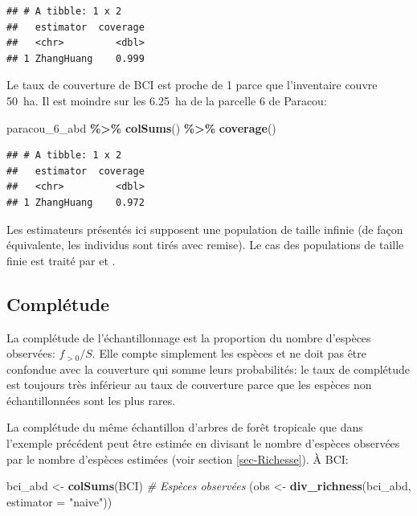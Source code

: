 \documentclass[
  11pt,
  american,
  a4paper,
  extrafontsizes,onecolumn,openright
  ]{memoir}
\newenvironment{Shaded}{\begin{snugshade}}{\end{snugshade}}
\newcommand{\AttributeTok}[1]{\textcolor[rgb]{0.13,0.29,0.53}{#1}}
\newcommand{\CommentTok}[1]{\textcolor[rgb]{0.56,0.35,0.01}{\textit{#1}}}
\newcommand{\FunctionTok}[1]{\textcolor[rgb]{0.13,0.29,0.53}{\textbf{#1}}}
\newcommand{\NormalTok}[1]{#1}
\newcommand{\OtherTok}[1]{\textcolor[rgb]{0.56,0.35,0.01}{#1}}
\newcommand{\SpecialCharTok}[1]{\textcolor[rgb]{0.81,0.36,0.00}{\textbf{#1}}}
\newcommand{\StringTok}[1]{\textcolor[rgb]{0.31,0.60,0.02}{#1}}
\begin{document}
\begin{verbatim}
## # A tibble: 1 x 2
##   estimator  coverage
##   <chr>         <dbl>
## 1 ZhangHuang    0.999
\end{verbatim}

\normalsize

Le taux de couverture de BCI est proche de 1 parce que l'inventaire couvre 50~ha.
Il est moindre sur les 6.25~ha de la parcelle 6 de Paracou:

\scriptsize

\begin{Shaded}
\begin{Highlighting}[]
\NormalTok{paracou\_6\_abd }\SpecialCharTok{\%\textgreater{}\%} 
  \FunctionTok{colSums}\NormalTok{() }\SpecialCharTok{\%\textgreater{}\%} 
  \FunctionTok{coverage}\NormalTok{()}
\end{Highlighting}
\end{Shaded}

\begin{verbatim}
## # A tibble: 1 x 2
##   estimator  coverage
##   <chr>         <dbl>
## 1 ZhangHuang    0.972
\end{verbatim}

\normalsize

Les estimateurs présentés ici supposent une population de taille infinie (de façon équivalente, les individus sont tirés avec remise).
Le cas des populations de taille finie est traité par \textcite{Chao2012} et \textcite{Hwang2014}.

\subsection{Complétude}\label{compluxe9tude}

La complétude de l'échantillonnage est la proportion du nombre d'espèces observées: \(f_{>0} / S\).
Elle compte simplement les espèces et ne doit pas être confondue avec la couverture qui somme leurs probabilités: le taux de complétude est toujours très inférieur au taux de couverture parce que les espèces non échantillonnées sont les plus rares.

La complétude du même échantillon d'arbres de forêt tropicale que dans l'exemple précédent peut être estimée en divisant le nombre d'espèces observées par le nombre d'espèces estimées (voir section \ref{sec-Richesse}).
À BCI:

\scriptsize

\begin{Shaded}
\begin{Highlighting}[]
\NormalTok{bci\_abd }\OtherTok{\textless{}{-}} \FunctionTok{colSums}\NormalTok{(BCI)}
\CommentTok{\# Espèces observées}
\NormalTok{(obs }\OtherTok{\textless{}{-}} \FunctionTok{div\_richness}\NormalTok{(bci\_abd, }\AttributeTok{estimator  =} \StringTok{"naive"}\NormalTok{))}
\end{Highlighting}
\end{Shaded}
\end{document}
